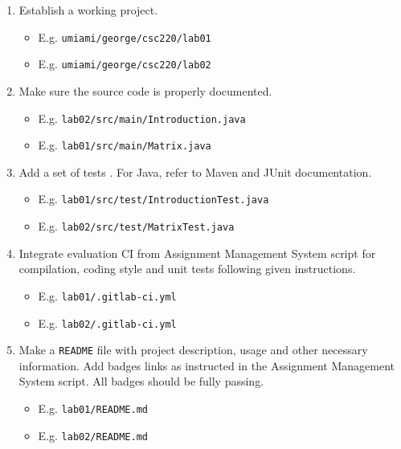 \begin{enumerate}
\item
  {Establish a working project.}
    \begin{itemize}
        \item
          {E.g. \texttt{umiami/george/csc220/lab01}}
        \item
          {E.g. \texttt{umiami/george/csc220/lab02}}
    \end{itemize}
\item
  {Make sure the source code is properly documented.}
    \begin{itemize}
    \item
      {E.g. \texttt{lab02/src/main/Introduction.java}}
    \item
      {E.g. \texttt{lab01/src/main/Matrix.java}}
    \end{itemize}

\item
  {Add a set of tests . For Java, refer to Maven and JUnit documentation.}    
    \begin{itemize}
    \item
      {E.g. \texttt{lab01/src/test/IntroductionTest.java}}
    \item
      {E.g. \texttt{lab02/src/test/MatrixTest.java}}
    \end{itemize}
    
\item
  {Integrate evaluation CI from Assignment Management System script  for compilation, coding style and unit tests following given instructions.}
    \begin{itemize}
    \item
      {E.g. \texttt{lab01/.gitlab-ci.yml}}
    \item
      {E.g. \texttt{lab02/.gitlab-ci.yml}}
    \end{itemize}

\item
  {Make a \texttt{README} file with project description, usage and other necessary information. Add badges links as instructed in the Assignment Management System script. All badges should be fully passing.}
    \begin{itemize}
    \item
      {E.g. \texttt{lab01/README.md}}
    \item
      {E.g. \texttt{lab02/README.md}}
    \end{itemize}
\end{enumerate}

